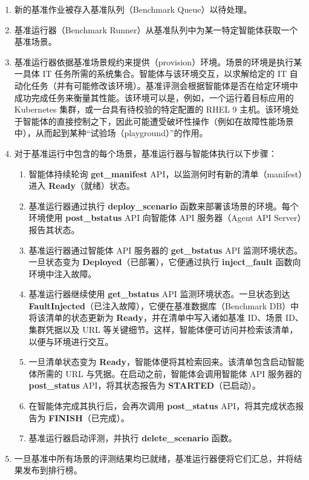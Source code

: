 \documentclass[10pt,UTF8,fontset=fandol]{ctexart}
\begin{document}
\begin{enumerate}
\item 新的基准作业被存入基准队列（Benchmark Queue）以待处理。
\item 基准运行器（Benchmark Runner）从基准队列中为某一特定智能体获取一个基准场景。
\item 基准运行器依据基准场景规约来提供（provision）环境。场景的环境是执行某一具体 IT 任务所需的系统集合。智能体与该环境交互，以求解给定的 IT 自动化任务（并有可能修改该环境）。基准评测会根据智能体是否在给定环境中成功完成任务来衡量其性能。该环境可以是，例如，一个运行着目标应用的 Kubernetes 集群，或一台具有待校验的特定配置的 RHEL 9 主机。该环境处于智能体的直接控制之下，因此可能遭受破坏性操作（例如在故障性能场景中），从而起到某种“试验场（playground）”的作用。
\item 对于基准运行中包含的每个场景，基准运行器与智能体执行以下步骤：
\begin{enumerate}
\item[(a)] 智能体持续轮询 \textbf{get\_manifest} API，以监测何时有新的清单（manifest）进入 \textbf{Ready}（就绪）状态。
\item[(b)] 基准运行器通过执行 \textbf{deploy\_scenario} 函数来部署该场景的环境。每个环境使用 \textbf{post\_bstatus} API 向智能体 API 服务器（Agent API Server）报告其状态。
\item[(c)] 基准运行器通过智能体 API 服务器的 \textbf{get\_bstatus} API 监测环境状态。一旦状态变为 \textbf{Deployed}（已部署），它便通过执行 \textbf{inject\_fault} 函数向环境中注入故障。
\item[(d)] 基准运行器继续使用 \textbf{get\_bstatus} API 监测环境状态。一旦状态到达 \textbf{FaultInjected}（已注入故障），它便在基准数据库（Benchmark DB）中将该清单的状态更新为 \textbf{Ready}，并在清单中写入诸如基准 ID、场景 ID、集群凭据以及 URL 等关键细节。这样，智能体便可访问并检索该清单，以便与环境进行交互。
\item[(e)] 一旦清单状态变为 \textbf{Ready}，智能体便将其检索回来。该清单包含启动智能体所需的 URL 与凭据。在启动之前，智能体会调用智能体 API 服务器的 \textbf{post\_status} API，将其状态报告为 \textbf{STARTED}（已启动）。
\item[(f)] 在智能体完成其执行后，会再次调用 \textbf{post\_status} API，将其完成状态报告为 \textbf{FINISH}（已完成）。
\item[(g)] 基准运行器启动评测，并执行 \textbf{delete\_scenario} 函数。
\end{enumerate}
\item 一旦基准中所有场景的评测结果均已就绪，基准运行器便将它们汇总，并将结果发布到排行榜。
\end{enumerate}
\end{document}

